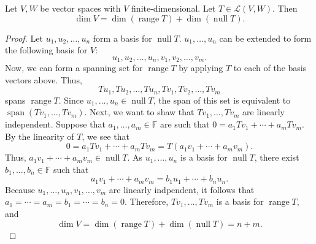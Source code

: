 \documentclass{article}
\begin{document}
\begin{theorem}\label{thm:rank_nullity}
	Let \(V, W\) be vector spaces with \(V\) finite-dimensional.  Let \(T\in
	\mathcal{L}(V,W)\).  Then
	\[
		\dim V = \dim (\operatorname{range} T) + \dim (\operatorname{null} T)
		.\]
\end{theorem}
\begin{proof}
	Let \(u_1, u_2, \ldots, u_n\) form a basis for \(\operatorname{null} T\).
	\(u_1, \ldots, u_n\) can be extended to form the following basis for \(V\):
	\[
		u_1, u_2, \ldots, u_n, v_1, v_2, \ldots, v_m
		.\]
	Now, we can form a spanning set for \(\operatorname{range} T\) by applying
	\(T\) to each of the basis vectors above.  Thus,
	\[
		Tu_1, Tu_2, \ldots, Tu_n, Tv_1, Tv_2, \ldots, Tv_m
	\]
	spans \(\operatorname{range} T\).  Since \(u_1, \ldots, u_n\in
	\operatorname{null} T\), the span of this set is equivalent to
	\(\operatorname{span}(Tv_1, \ldots, Tv_m)\).  Next, we want to shaw that
	\(Tv_1, \ldots, Tv_m\) are linearly independent.  Suppose that \(a_1, \ldots,
	a_m\in \mathbb{F}\) are such that \(0 = a_1 Tv_1 + \cdots + a_m Tv_m\).  By
	the linearity of \(T\), we see that
	\[
		0 = a_1 Tv_1 + \cdots + a_m Tv_m = T (a_1v_1 + \cdots + a_mv_m)
		.\]
	Thus, \(a_1v_1 + \cdots + a_mv_m \in \operatorname{null} T\). As \(u_1,
	\ldots, u_n\) is a basis for \(\operatorname{null} T\), there exist \(b_1,
	\ldots, b_n\in \mathbb{F}\) such that
	\[
		a_1v_1 + \cdots + a_mv_m = b_1u_1 + \cdots + b_nu_n
		.\]
	Because \(u_1, \ldots, u_n, v_1, \ldots, v_m\) are linearly indpendent, it
	follows that \(a_1 = \cdots = a_m = b_1 = \cdots = b_n = 0\).  Therefore,
	\(Tv_1, \ldots, Tv_m\) is a basis for \(\operatorname{range} T\), and
	\[
		\dim V = \dim (\operatorname{range} T) + \dim (\operatorname{null} T) = n + m
		.\]
\end{proof}
\end{document}

